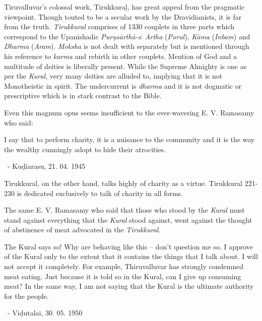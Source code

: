 Tiruvalluvar’s colossal work, Tirukkuraḻ, has great appeal from the pragmatic viewpoint. Though touted to be a secular work by the Dravidianists, it is far from the truth. \textit{Tirukkural} comprises of 1330 couplets in three parts which correspond to the Upanishadic \textit{Purụsārthā-s}: \textit{Artha} (\textit{Porul}), \textit{Kāma} (\textit{Inbam}) and \textit{Dharma} (\textit{Aram}). \textit{Moksha} is not dealt with separately but is mentioned through his reference to \textit{karma} and rebirth in other couplets. Mention of God and a multitude of deities is liberally present. While the Supreme Almighty is one as per the \textit{Kural}, very many deities are alluded to, implying that it is not Monotheistic in spirit. The undercurrent is \textit{dharma} and it is not dogmatic or prescriptive which is in stark contrast to the Bible.

Even this magnum opus seems insufficient to the ever-wavering E. V. Ramasamy who said:

\begin{myquote}
I say that to perform charity, it is a nuisance to the community and it is the way the wealthy cunningly adopt to hide their atrocities.

~\hfill - Kuḍiarasu, 21. 04. 1945
\end{myquote}

Tirukkural, on the other hand, talks highly of charity as a virtue. Tirukkural 221-230 is dedicated exclusively to talk of charity in all forms.

The same E. V. Ramasamy who said that those who stood by the \textit{Kural} must stand against everything that the \textit{Kural} stood against, went against the thought of abstinence of meat advocated in the \textit{Tirukkural}.

\begin{myquote}
The Kural says so! Why are behaving like this – don’t question me so. I approve of the Kural only to the extent that it contains the things that I talk about. I will not accept it completely. For example, Thiruvalluvar has strongly condemned meat eating. Just because it is told so in the Kural, can I give up consuming meat? In the same way, I am not saying that the Kural is the ultimate authority for the people.

~\hfill - Viḍutalai, 30. 05. 1950
\end{myquote}

